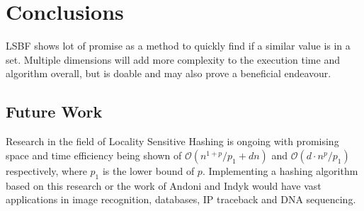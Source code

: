 \chapter{Conclusions}

LSBF shows lot of promise as a method to quickly find if a similar value is in a set. Multiple dimensions will add more complexity to the execution time and algorithm overall, but is doable and may also prove a beneficial endeavour.

\section{Future Work}
Research in the field of Locality Sensitive Hashing is ongoing with promising space and time efficiency being shown of $ \mathcal{O}(n^{1+p}/p_1 +dn) $ and $ \mathcal{O}(d\cdot n^p/p_1) $ respectively, where $p_1$ is the lower bound of $p$. \cite{LSH} Implementing a hashing algorithm based on this research or the work of Andoni and Indyk \cite{NearestNeighborHighDimensions} would have vast applications in image recognition, databases, IP traceback and DNA sequencing. \cite{DSBF}